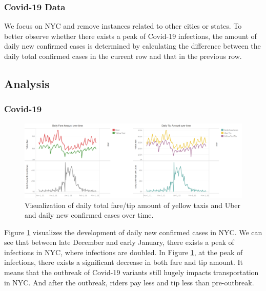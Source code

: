 \documentclass[11pt]{article}
\begin{document}
\subsubsection{Covid-19 Data}
We focus on NYC and remove instances related to other cities or states. To better observe whether there exists a peak of Covid-19 infections, the amount of daily new confirmed cases is determined by calculating the difference between the daily total confirmed cases in the current row and that in the previous row. 



\subsection{Analysis}
\subsubsection{Covid-19}
\begin{figure}
    \centering
    \includegraphics[scale = 0.18]{fare_and_tip_corona.png}
    \caption{Visualization of daily total fare/tip amount of yellow taxis and Uber and daily new confirmed cases over time.}
    \label{fig:coroa}
\end{figure}
Figure \ref{fig:coroa} visualizes the development of daily new confirmed cases in NYC. We can see that between late December and early January, there exists a peak of infections in NYC, where infections are doubled. In Figure  \ref{fig:coroa}, at the peak of infections, there exists a significant decrease in both fare and tip amount. It means that the outbreak of Covid-19 variants still hugely impacts transportation in NYC. And after the outbreak, riders pay less and tip less than pre-outbreak. 
\end{document}

